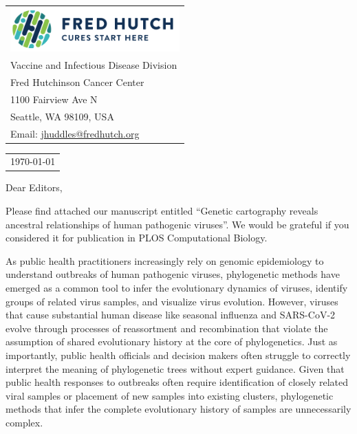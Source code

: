 \documentclass[11pt]{article}
\begin{document}
\thispagestyle{empty} %

\mbox{}\hfill
\begin{tabular}{l @{}}
	\includegraphics[width=6.5cm]{fhcc_logo} \\
	Vaccine and Infectious Disease Division \\
	Fred Hutchinson Cancer Center \\
	1100 Fairview Ave N \\
	Seattle, WA 98109, USA \\
	Email: \href{mailto:jhuddles@fredhutch.org}{jhuddles@fredhutch.org} \\
\end{tabular}

\vspace{0.1in} %

\begin{tabular}{@{} l}
  \today
\end{tabular}

\vspace{0.1in} %

Dear Editors,

\medskip %

Please find attached our manuscript entitled ``Genetic cartography reveals ancestral relationships of human pathogenic viruses''.
We would be grateful if you considered it for publication in PLOS Computational Biology.

As public health practitioners increasingly rely on genomic epidemiology to understand outbreaks of human pathogenic viruses, phylogenetic methods have emerged as a common tool to infer the evolutionary dynamics of viruses, identify groups of related virus samples, and visualize virus evolution.
However, viruses that cause substantial human disease like seasonal influenza and SARS-CoV-2 evolve through processes of reassortment and recombination that violate the assumption of shared evolutionary history at the core of phylogenetics.
Just as importantly, public health officials and decision makers often struggle to correctly interpret the meaning of phylogenetic trees without expert guidance.
Given that public health responses to outbreaks often require identification of closely related viral samples or placement of new samples into existing clusters, phylogenetic methods that infer the complete evolutionary history of samples are unnecessarily complex.
\end{document}
